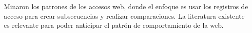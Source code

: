  Minaron los patrones de los accesos web, donde el enfoque es usar los registros de acceso para crear subsecuencias y realizar comparaciones.
  La literatura existente es relevante para poder anticipar el patrón de comportamiento de la web.
